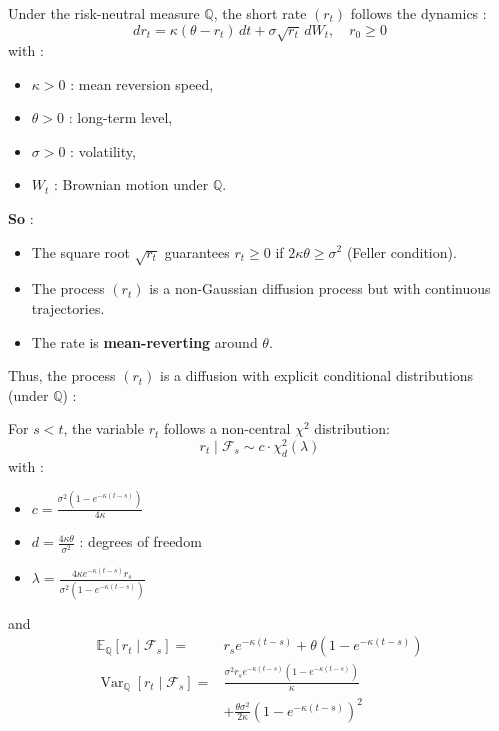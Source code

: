 \begin{f}
	
Under the risk-neutral measure $\mathbb{Q}$, the short rate $(r_t)$ follows the dynamics :
\[
dr_t = \kappa(\theta - r_t)\,dt + \sigma \sqrt{r_t}\, dW_t, \quad r_0 \geq 0
\]
with :
\begin{itemize}[nosep]
	\item $\kappa > 0$ : mean reversion speed,
	\item $\theta > 0$ : long-term level,
	\item $\sigma > 0$ : volatility,
	\item $W_t$ : Brownian motion under $\mathbb{Q}$.
\end{itemize}

\textbf{So} :
\begin{itemize}
	\item The square root $\sqrt{r_t}$ guarantees $r_t \geq 0$ if $2\kappa\theta \geq \sigma^2$ (Feller condition).
	\item The process $(r_t)$ is a non-Gaussian diffusion process but with continuous trajectories.
	\item The rate is \textbf{mean-reverting} around $\theta$.
\end{itemize}

Thus, the process $(r_t)$ is a diffusion with explicit conditional distributions (under $\mathbb{Q}$) :

For $s < t$, the variable $r_t$ follows a non-central $\chi^2$ distribution:
\[
r_t \mid \mathcal{F}_s \sim c \cdot \chi^2_{d}(\lambda)
\]
with :
\begin{itemize}[nosep]
	\item $\displaystyle c = \frac{\sigma^2 (1 - e^{-\kappa (t - s)})}{4\kappa}$
	\item $\displaystyle d = \frac{4\kappa\theta}{\sigma^2}$ : degrees of freedom
	\item $\displaystyle \lambda = \frac{4\kappa e^{-\kappa (t - s)} r_s}{\sigma^2 (1 - e^{-\kappa (t - s)})}$
\end{itemize}

and
\[
\begin{aligned}
	\mathbb{E}_\mathbb{Q}[r_t \mid \mathcal{F}_s] =& r_s e^{-\kappa(t-s)} + \theta (1 - e^{-\kappa(t-s)}) \\
	\operatorname{Var}_\mathbb{Q}[r_t \mid \mathcal{F}_s] =& \frac{\sigma^2 r_s e^{-\kappa(t-s)} (1 - e^{-\kappa(t-s)})}{\kappa} \\
			&+ \frac{\theta \sigma^2}{2\kappa} (1 - e^{-\kappa(t-s)})^2
\end{aligned}
\]

\end{f}
